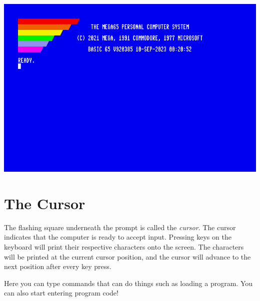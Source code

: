 \begin{center}
  \includegraphics[width=0.7\linewidth]{images/img011_final_boot_06.png}
\end{center}

\section{The Cursor}

The flashing square underneath the  prompt is called the \emph{cursor}. The cursor indicates that the computer is ready to accept input. Pressing keys on the keyboard will print their respective characters onto the screen. The characters will be printed at the current cursor position, and the cursor will advance to the next position after every key press.

Here you can type commands that can do things such as loading a program. You can also start entering program code!
